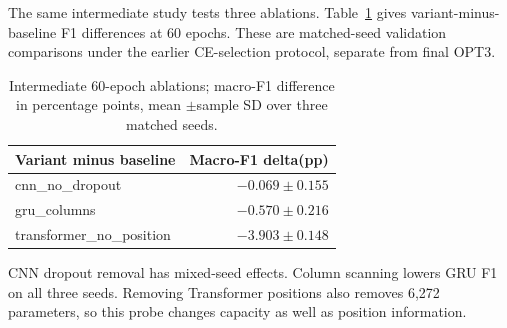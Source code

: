 The same intermediate study tests three ablations. Table\ \ref{tab:ablations} gives variant-minus-baseline F1 differences at 60 epochs. These are matched-seed validation comparisons under the earlier CE-selection protocol, separate from final OPT3.
\begin{table}[H]\centering\caption{Intermediate 60-epoch ablations; macro-F1 difference in percentage points, mean $\pm$sample SD over three matched seeds.}\label{tab:ablations}

\begin{center}
\small
\begin{tabular}{lr}
\toprule
Variant minus baseline & Macro-F1 delta(pp) \\
\midrule
cnn\_no\_dropout & $-0.069 \pm 0.155$ \\
gru\_columns & $-0.570 \pm 0.216$ \\
transformer\_no\_position & $-3.903 \pm 0.148$ \\
\bottomrule
\end{tabular}
\end{center}
\end{table}
CNN dropout removal has mixed-seed effects. Column scanning lowers GRU F1 on all three seeds. Removing Transformer positions also removes 6,272 parameters, so this probe changes capacity as well as position information.

\clearpage
